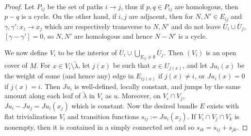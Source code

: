 \documentclass[reqno,10pt]{amsart}
\theoremstyle{definition}
\numberwithin{equation}{section}
\begin{document}
\begin{proof}
Let $P_{ij}$ be the set of paths $i \to j$, thus if $p, q \in P_{ij}$ are homologous, then $p - q$ is a cycle.
On the other hand, if $i, j$ are adjacent, then for $N, N' \in E_{ij}$ and $\gamma, \gamma': x_i \to x_j$ which are respectively transverse to $N, N'$ and do not leave $\overline U_i \cup \overline U_j$, $[\gamma - \gamma'] = 0$, so $N, N'$ are homologous and hence $N - N'$ is a cycle.

We now define $V_i$ to be the interior of $\overline U_i \cup \bigcup_{E_{ij} \neq \emptyset} \overline U_j$.
Then $(V_i)$ is an open cover of $M$.
For $x \in V_i \setminus \tilde \lambda$, let $j(x)$ be such that $x \in U_{j(x)}$, and let $Ju_i(x)$ be the weight of some (and hence any) edge in $E_{ij(x)}$ if $j(x) \neq i$, or $Ju_i(x) = 0$ if $j(x) = i$.
Then $Ju_i$ is well-defined, locally constant, and jumps by the same amount along each leaf of $\tilde \lambda$ in $V_i$ as $u$.
Moreover, on $V_i \cap V_j$, $Ju_i - Ju_j = Ju_i(x_j)$ which is constant.
Now the desired bundle $E$ exists with flat trivializations $V_i$ and transition functions $s_{ij} := Ju_i(x_j)$.
If $V_i \cap V_j \cap V_k$ is nonempty, then it is contained in a simply connected set and so $s_{ik} = s_{ij} + s_{jk}$.
\end{proof}
\end{document}
